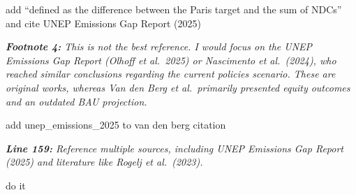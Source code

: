 \documentclass[11pt]{article}
\newenvironment{italic}{\itshape}{\par}
\begin{document}
add ``defined as the difference between the Paris target and the sum of NDCs'' and cite UNEP Emissions Gap Report (2025)




\begin{italic}
\textbf{Footnote 4:} This is not the best reference. I would focus on the UNEP Emissions Gap Report (Olhoff et al.\ 2025) or Nascimento et al.\ (2024), who reached similar conclusions regarding the current policies scenario. These are original works, whereas Van den Berg et al.\ primarily presented equity outcomes and an outdated BAU projection.
\end{italic}


add unep_emissions_2025 to van den berg citation 



\begin{italic}
\textbf{Line 159:} Reference multiple sources, including UNEP Emissions Gap Report (2025) and literature like Rogelj et al.\ (2023).
\end{italic}


do it
\end{document}

